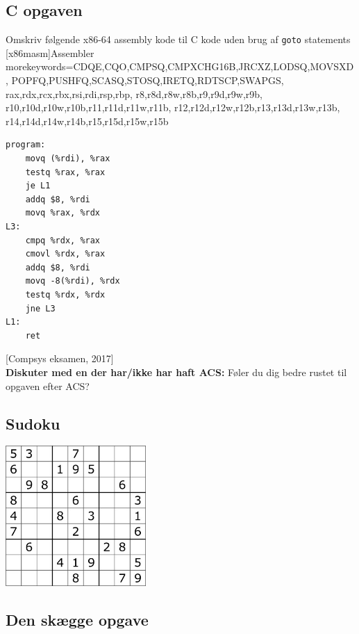 \subsection{C opgaven}
Omskriv følgende x86-64 assembly kode til C kode uden brug af \verb|goto|
statements
   [x86masm]{Assembler} %
   {morekeywords={CDQE,CQO,CMPSQ,CMPXCHG16B,JRCXZ,LODSQ,MOVSXD, %
                  POPFQ,PUSHFQ,SCASQ,STOSQ,IRETQ,RDTSCP,SWAPGS, %
                  rax,rdx,rcx,rbx,rsi,rdi,rsp,rbp, %
                  r8,r8d,r8w,r8b,r9,r9d,r9w,r9b, %
                  r10,r10d,r10w,r10b,r11,r11d,r11w,r11b, %
                  r12,r12d,r12w,r12b,r13,r13d,r13w,r13b, %
                  r14,r14d,r14w,r14b,r15,r15d,r15w,r15b}} %
\begin{lstlisting}[language={[x64]Assembler}]
program:
    movq (%rdi), %rax
    testq %rax, %rax
    je L1
    addq $8, %rdi
    movq %rax, %rdx
L3:
    cmpq %rdx, %rax
    cmovl %rdx, %rax
    addq $8, %rdi
    movq -8(%rdi), %rdx
    testq %rdx, %rdx
    jne L3
L1:
    ret
\end{lstlisting}
[Compsys eksamen, 2017]\\
\textbf{Diskuter med en der har/ikke har haft ACS:} Føler du dig bedre
rustet til opgaven efter ACS?
\subsection{Sudoku}
\begin{center}
    \includegraphics[width=0.4\textwidth]{figures/sudoku.jpg}
\end{center}

\newpage

\subsection{Den skægge opgave}

